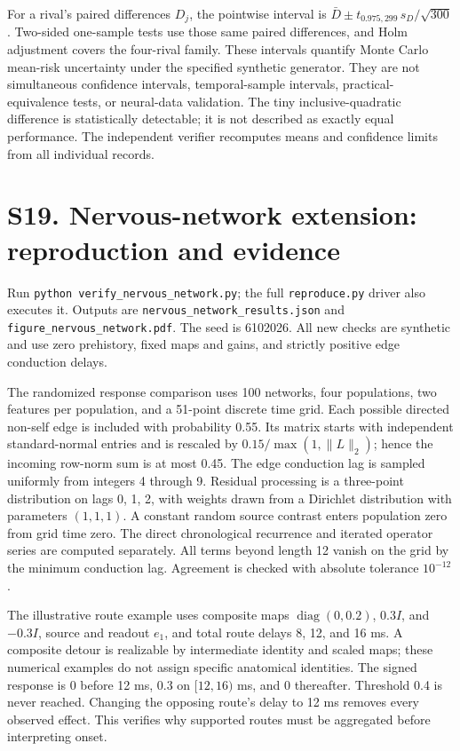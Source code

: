 \documentclass[11pt,a4paper]{article}
\begin{document}
For a rival's paired differences $D_j$, the pointwise interval is $\bar D\pm t_{0.975,299}\,s_D/\sqrt{300}$. Two-sided one-sample tests use those same paired differences, and Holm adjustment covers the four-rival family. These intervals quantify Monte Carlo mean-risk uncertainty under the specified synthetic generator. They are not simultaneous confidence intervals, temporal-sample intervals, practical-equivalence tests, or neural-data validation. The tiny inclusive-quadratic difference is statistically detectable; it is not described as exactly equal performance. The independent verifier recomputes means and confidence limits from all individual records.



\section*{S19. Nervous-network extension: reproduction and evidence}
Run \texttt{python verify\_nervous\_network.py}; the full \texttt{reproduce.py} driver also executes it. Outputs are \texttt{nervous\_network\_results.json} and \texttt{figure\_nervous\_network.pdf}. The seed is 6102026. All new checks are synthetic and use zero prehistory, fixed maps and gains, and strictly positive edge conduction delays.

The randomized response comparison uses 100 networks, four populations, two features per population, and a 51-point discrete time grid. Each possible directed non-self edge is included with probability 0.55. Its matrix starts with independent standard-normal entries and is rescaled by $0.15/\max(1,\|L\|_2)$; hence the incoming row-norm sum is at most 0.45. The edge conduction lag is sampled uniformly from integers 4 through 9. Residual processing is a three-point distribution on lags 0, 1, 2, with weights drawn from a Dirichlet distribution with parameters $(1,1,1)$. A constant random source contrast enters population zero from grid time zero. The direct chronological recurrence and iterated operator series are computed separately. All terms beyond length 12 vanish on the grid by the minimum conduction lag. Agreement is checked with absolute tolerance $10^{-12}$.

The illustrative route example uses composite maps $\operatorname{diag}(0,0.2)$, $0.3I$, and $-0.3I$, source and readout $e_1$, and total route delays 8, 12, and 16 ms. A composite detour is realizable by intermediate identity and scaled maps; these numerical examples do not assign specific anatomical identities. The signed response is 0 before 12 ms, 0.3 on $[12,16)$ ms, and 0 thereafter. Threshold 0.4 is never reached. Changing the opposing route's delay to 12 ms removes every observed effect. This verifies why supported routes must be aggregated before interpreting onset.
\end{document}
